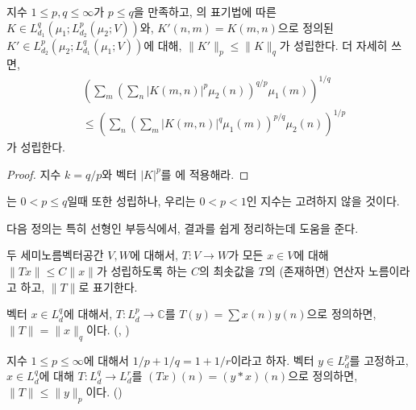 \begin{theorem}
\label{thm:genminkowski}  
    지수 $1 \leq p, q \leq \infty$가 $ p \leq q$을 만족하고, 의 표기법에 따른 $K \in L^q_{d_1}(\mu_1; L^p_{d_2}(\mu_2; V))$와, $K'(n, m) = K(m, n)$으로 정의된 $K' \in L^p_{d_2}(\mu_2; L^q_{d_1}(\mu_1; V))$에 대해, $\|K'\|_p \leq \|K\|_q$가 성립한다.
    더 자세히 쓰면,
    \begin{equation*}
    \begin{split}
        &\left( \sum_m \left( \sum_n |K(m, n)|^p \mu_2(n) \right)^{q/p} \mu_1(m) \right)^{1/q}  \\
        &\leq \left( \sum_n \left( \sum_m |K(m,n)|^q \mu_1(m) \right)^{p/q} \mu_2(n) \right)^{1/p}
    \end{split}
    \end{equation*}
    가 성립한다.
\end{theorem}
\begin{proof}
    지수 $k = q/p$와 벡터 $|K|^p$를 에 적용해라.
\end{proof}

\begin{remark}
    는 $0 < p \leq q$일때 또한 성립하나, 우리는 $0 < p < 1$인 지수는 고려하지 않을 것이다.
\end{remark}

다음 정의는 특히 선형인 부등식에서, 결과를 쉽게 정리하는데 도움을 준다.

\begin{definition}
\label{def:opnorm} 
    두 세미노름벡터공간 $V, W$에 대해서, $T: V \to W$가 모든 $x \in V$에 대해 $\|Tx\| \leq C\|x\|$가 성립하도록 하는 $C$의 최솟값을 $T$의 (존재하면) 연산자 노름이라고 하고, $\|T\|$로 표기한다.
\end{definition}

\begin{example}
    벡터 $x \in L^q_d$에 대해서, $T : L^p_d \to \mathbb{C}$를 $T(y) = \sum x(n)y(n)$으로 정의하면, $\|T\| = \|x\|_q$이다. (, )
\end{example}
\begin{example}
    지수 $1 \leq p \leq \infty$에 대해서 $1/p + 1/q = 1 + 1/r$이라고 하자.
    벡터 $y \in L^p_d$를 고정하고, $x \in L^q_d$에 대해 $T: L^q_d \to L^r_d$를 $(Tx)(n) = (y * x)(n)$으로 정의하면, $\|T\| \leq \|y\|_p$이다. ()
\end{example}

